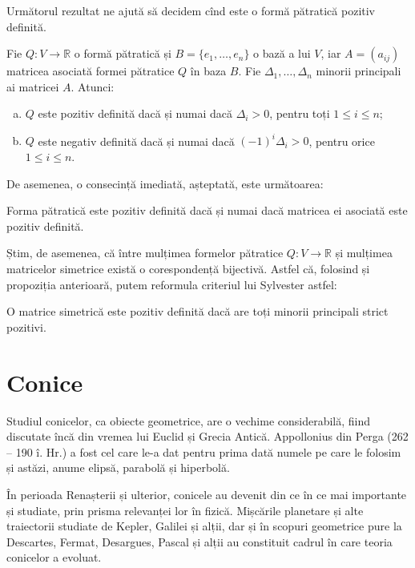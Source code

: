 Următorul rezultat ne ajută să decidem cînd este o formă pătratică pozitiv
definită.

\begin{theorem}
	Fie $Q : V \to \mathbb{R}$ o formă pătratică și $B = \{e_1, \dots, e_n\}$
o bază a lui $V$, iar $A = (a_{ij})$ matricea asociată formei pătratice
$Q$ în baza $B$. Fie $\Delta_1, \dots, \Delta_n$ minorii principali ai matricei
$A$. Atunci:
\begin{enumerate}[(a)]
	\item $Q$ este pozitiv definită dacă și numai dacă $\Delta_i > 0$, pentru
toți $1 \leq i \leq n$;
    \item $Q$ este negativ definită dacă și numai dacă $(-1)^i \Delta_i > 0$,
pentru orice $1 \leq i \leq n$.
\end{enumerate}
\end{theorem}

De asemenea, o consecință imediată, așteptată, este următoarea:

\begin{proposition}
	Forma pătratică este pozitiv definită dacă și numai dacă matricea ei 
asociată este pozitiv definită.	
\end{proposition}

Știm, de asemenea, că între mulțimea formelor pătratice $Q : V \to \mathbb{R}$ 
și mulțimea matricelor simetrice există o corespondență bijectivă. Astfel că,
folosind și propoziția anterioară, putem reformula criteriul lui Sylvester
astfel:

\begin{theorem}
	O matrice simetrică este pozitiv definită dacă are toți minorii principali 
strict pozitivi.
\end{theorem}


\section{Conice}

\indent\indent Studiul conicelor, ca obiecte geometrice, are o vechime 
considerabilă, fiind discutate încă din vremea lui Euclid și Grecia Antică.
Appollonius din Perga (262 -- 190 î. Hr.) a fost cel care le-a dat pentru prima
dată numele pe care le folosim și astăzi, anume elipsă, parabolă și hiperbolă.

În perioada Renașterii și ulterior, conicele au devenit din ce în ce mai
importante și studiate, prin prisma relevanței lor în fizică. Mișcările 
planetare și alte traiectorii studiate de Kepler, Galilei și alții, dar și în
scopuri geometrice pure la Descartes, Fermat, Desargues, Pascal și alții au
constituit cadrul în care teoria conicelor a evoluat.

